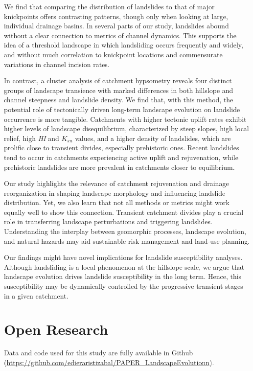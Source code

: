 \documentclass[draft]{agujournal2019}
\begin{document}
\par We find that comparing the distribution of landslides to that of major knickpoints offers contrasting patterns, though only when looking at large, individual drainage basins. In several parts of our study, landslides abound without a clear connection to metrics of channel dynamics. This supports the idea of a threshold landscape in which landsliding occurs frequently and widely, and without much correlation to knickpoint locations and commensurate variations in channel incision rates.

\par In contrast, a cluster analysis of catchment hypsometry reveals four distinct groups of landscape transience with marked differences in both hillslope and channel steepness and landslide density. We find that, with this method, the potential role of tectonically driven long-term landscape evolution on landslide occurrence is more tangible. Catchments with higher tectonic uplift rates exhibit higher levels of landscape disequilibrium, characterized by steep slopes, high local relief, high \textit{HI} and $K_{sn}$ values, and a higher density of landslides, which are prolific close to transient divides, especially prehistoric ones. Recent landslides tend to occur in catchments experiencing active uplift and rejuvenation, while prehistoric landslides are more prevalent in catchments closer to equilibrium.  

\par Our study highlights the relevance of catchment rejuvenation and drainage reorganization in shaping landscape morphology and influencing landslide distribution. Yet, we also learn that not all methods or metrics might work equally well to show this connection. Transient catchment divides play a crucial role in transferring landscape perturbations and triggering landslides. Understanding the interplay between geomorphic processes, landscape evolution, and natural hazards may aid sustainable risk management and land-use planning. 

\par Our findings might have novel implications for landslide susceptibility analyses. Although landsliding is a local phenomenon at the hillslope scale, we argue that landscape evolution drives landslide susceptibility in the long term. Hence, this susceptibility may be dynamically controlled by the progressive transient stages in a given catchment.


\section{Open Research}
Data and code used for this study are fully available in Github (\url{https://github.com/edieraristizabal/PAPER_LandscapeEvolutionn}).
\end{document}
